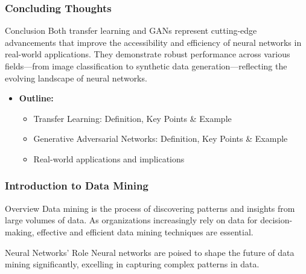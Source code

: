 \documentclass[aspectratio=169]{beamer}
\begin{document}
\begin{frame}[fragile]
    \frametitle{Concluding Thoughts}
    \begin{block}{Conclusion}
        Both transfer learning and GANs represent cutting-edge advancements that improve the accessibility and efficiency of neural networks in real-world applications. They demonstrate robust performance across various fields—from image classification to synthetic data generation—reflecting the evolving landscape of neural networks.
    \end{block}

    \begin{itemize}
        \item \textbf{Outline:}
        \begin{itemize}
            \item Transfer Learning: Definition, Key Points \& Example
            \item Generative Adversarial Networks: Definition, Key Points \& Example
            \item Real-world applications and implications
        \end{itemize}
    \end{itemize}
\end{frame}

\begin{frame}[fragile]
    \frametitle{Introduction to Data Mining}
    \begin{block}{Overview}
        Data mining is the process of discovering patterns and insights from large volumes of data. As organizations increasingly rely on data for decision-making, effective and efficient data mining techniques are essential.
    \end{block}
    \begin{block}{Neural Networks' Role}
        Neural networks are poised to shape the future of data mining significantly, excelling in capturing complex patterns in data.
    \end{block}
\end{frame}
\end{document}
